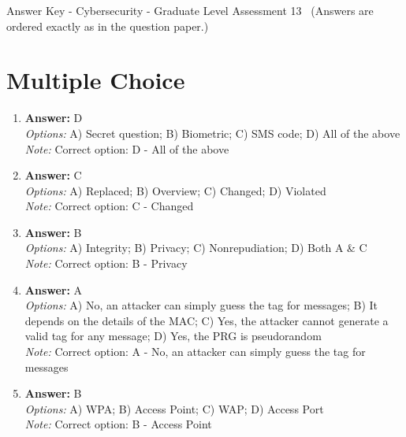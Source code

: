 \documentclass[12pt]{article}
\begin{document}
\begin{center}
Answer Key - Cybersecurity - Graduate Level Assessment 13 \
\small (Answers are ordered exactly as in the question paper.)
\end{center}

\section*{Multiple Choice}
\begin{enumerate}[label=\arabic*.]
\item \textbf{Answer:} D
\\ \textit{Options:} A) Secret question; B) Biometric; C) SMS code; D) All of the above
\\ \textit{Note:} Correct option: D - All of the above
\item \textbf{Answer:} C
\\ \textit{Options:} A) Replaced; B) Overview; C) Changed; D) Violated
\\ \textit{Note:} Correct option: C - Changed
\item \textbf{Answer:} B
\\ \textit{Options:} A) Integrity; B) Privacy; C) Nonrepudiation; D) Both A \& C
\\ \textit{Note:} Correct option: B - Privacy
\item \textbf{Answer:} A
\\ \textit{Options:} A) No, an attacker can simply guess the tag for messages; B) It depends on the details of the MAC; C) Yes, the attacker cannot generate a valid tag for any message; D) Yes, the PRG is pseudorandom
\\ \textit{Note:} Correct option: A - No, an attacker can simply guess the tag for messages
\item \textbf{Answer:} B
\\ \textit{Options:} A) WPA; B) Access Point; C) WAP; D) Access Port
\\ \textit{Note:} Correct option: B - Access Point
\end{enumerate}
\end{document}
